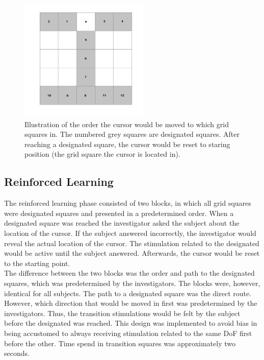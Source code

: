 \begin{figure}[H]                 
	\includegraphics[width=0.55\textwidth]{figures/gridmap_FBfam}  
	\caption{Illustration of the order the cursor would be moved to which grid squares in. The numbered grey squares are designated squares. After reaching a designated square, the cursor would be reset to staring position (the grid square the cursor is located in).}
	\label{fig:gridmap_FBfam} 
\end{figure}

\subsection{Reinforced Learning} \label{sec:meth:FBtrainingRe}
The reinforced learning phase consisted of two blocks, in which all grid squares were designated squares and presented in a predetermined order. When a designated square was reached the investigator asked the subject about the location of the cursor. If the subject answered incorrectly, the investigator would reveal the actual location of the cursor. The stimulation related to the designated would be active until the subject answered. Afterwards, the cursor would be reset to the starting point. \\
The difference between the two blocks was the order and path to the designated squares, which was predetermined by the investigators. The blocks were, however, identical for all subjects. The path to a designated square was the direct route. However, which direction that would be moved in first was predetermined by the investigators. Thus, the transition stimulations would be felt by the subject before the designated was reached. This design was implemented to avoid bias in being accustomed to always receiving stimulation related to the same DoF first before the other. Time spend in transition squares was approximately two seconds. 